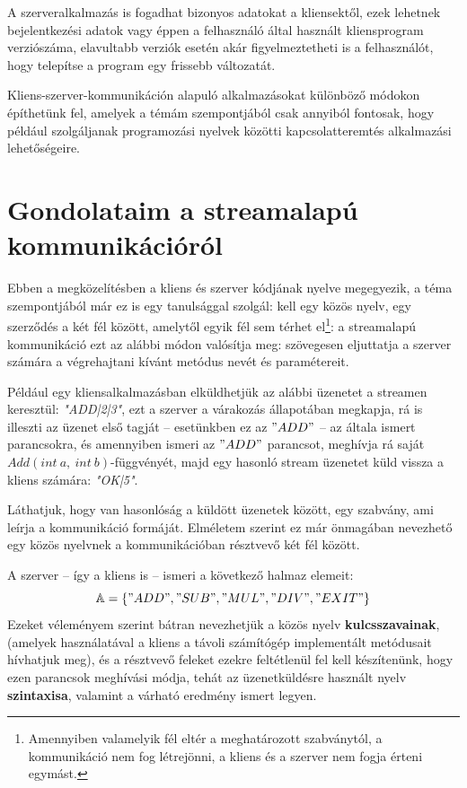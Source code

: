 \documentclass[tocnopagenum]{thesis-ekf}
\theoremstyle{definition}
\theoremstyle{remark}
\begin{document}
	A szerveralkalmazás is fogadhat bizonyos adatokat a kliensektől, ezek lehetnek bejelentkezési adatok vagy éppen a felhasználó által használt kliensprogram verziószáma, elavultabb verziók esetén akár figyelmeztetheti is a felhasználót, hogy telepítse a program egy frissebb változatát. \cite{client_server}
	
	Kliens-szerver-kommunikáción alapuló alkalmazásokat különböző módokon építhetünk fel, amelyek a témám szempontjából csak annyiból fontosak, hogy például szolgáljanak programozási nyelvek közötti kapcsolatteremtés alkalmazási lehetőségeire.
	\section{Gondolataim a streamalapú kommunikációról}
	Ebben a megközelítésben a kliens és szerver kódjának nyelve megegyezik, a téma szempontjából már ez is egy tanulsággal szolgál: kell egy közös nyelv, egy szerződés a két fél között, amelytől egyik fél sem térhet el\footnote{Amennyiben valamelyik fél eltér a meghatározott szabványtól, a kommunikáció nem fog létrejönni, a kliens és a szerver nem fogja érteni egymást.}: a streamalapú kommunikáció ezt az alábbi módon valósítja meg: szövegesen eljuttatja a szerver számára a végrehajtani kívánt metódus nevét és paramétereit.
	
	Például egy kliensalkalmazásban elküldhetjük az alábbi üzenetet a streamen keresztül: \textit{"ADD|2|3"}, ezt a szerver a várakozás állapotában megkapja, rá is illeszti az üzenet első tagját -- esetünkben ez az $"ADD"$ -- az általa ismert parancsokra, és amennyiben ismeri az $"ADD"$ parancsot, meghívja rá saját $Add(int\ a,\ int\ b)$-függvényét, majd egy hasonló stream üzenetet küld vissza a kliens számára: \textit{"OK|5"}. \cite{elearning_stream}
	
	Láthatjuk, hogy van hasonlóság a küldött üzenetek között, egy szabvány, ami leírja a kommunikáció formáját. Elméletem szerint ez már önmagában nevezhető egy közös nyelvnek a kommunikációban résztvevő két fél között. 
	
	A szerver -- így a kliens is -- ismeri a következő halmaz elemeit: $$\mathbb{A} = \{"ADD", "SUB", "MUL", "DIV", "EXIT"\}$$
	Ezeket véleményem szerint bátran nevezhetjük a közös nyelv \textbf{kulcsszavainak}, (amelyek használatával a kliens a távoli számítógép implementált metódusait hívhatjuk meg), és a résztvevő feleket ezekre feltétlenül fel kell készítenünk, hogy ezen parancsok meghívási módja, tehát az üzenetküldésre használt nyelv \textbf{szintaxisa}, valamint a várható eredmény ismert legyen.
	
\end{document}
